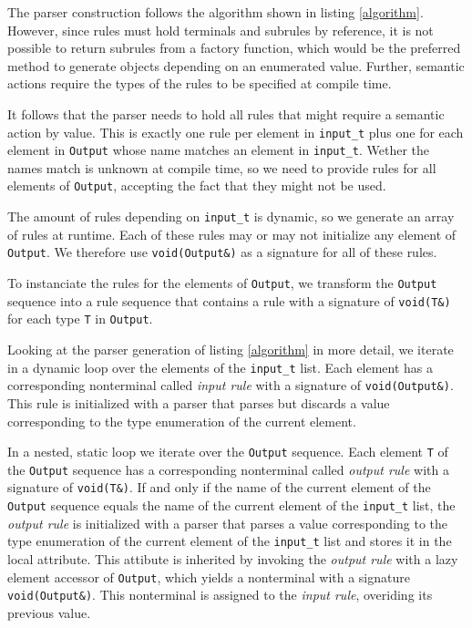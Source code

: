 The parser construction follows the algorithm shown in listing \ref{algorithm}.
However, since rules must hold terminals and subrules by reference, it is not
possible to return subrules from a factory function, which would be the
preferred method to generate objects depending on an enumerated value. Further,
semantic actions require the types of the rules to be specified at compile time.

It follows that the parser needs to hold all rules that might require a semantic
action by value. This is exactly one rule per element in \texttt{input\_t} plus
one for each element in \texttt{Output} whose name matches an element in
\texttt{input\_t}. Wether the names match is unknown at compile time, so we need
to provide rules for all elements of \texttt{Output}, accepting the fact that
they might not be used.

The amount of rules depending on \texttt{input\_t} is dynamic, so we generate an
array of rules at runtime. Each of these rules may or may not initialize any
element of \texttt{Output}. We therefore use \texttt{void(Output\&)} as a
signature for all of these rules.

To instanciate the rules for the elements of \texttt{Output}, we transform
the \texttt{Output} sequence into a rule sequence that contains a rule with a
signature of \texttt{void(T\&)} for each type \texttt{T} in \texttt{Output}.


Looking at the parser generation of listing \ref{algorithm} in more detail, we
iterate in a dynamic loop over the elements of the \texttt{input\_t} list. Each
element has a corresponding nonterminal called \emph{input rule} with a
signature of \texttt{void(Output\&)}. This rule is initialized with a parser
that parses but discards a value corresponding to the type enumeration of the
current element.

In a nested, static loop we iterate over the \texttt{Output} sequence. Each
element \texttt{T} of the \texttt{Output} sequence has a corresponding
nonterminal called \emph{output rule} with a signature of \texttt{void(T\&)}.
If and only if the name of the current element of the \texttt{Output} sequence
equals the name of the current element of the \texttt{input\_t} list, the
\emph{output rule} is initialized with a parser that parses a value
corresponding to the type enumeration of the current element of the
\texttt{input\_t} list and stores it in the local attribute. This attibute is
inherited by invoking the \emph{output rule} with a lazy element accessor of
\texttt{Output}, which yields a nonterminal with a signature
\texttt{void(Output\&)}. This nonterminal is assigned to the \emph{input rule},
overiding its previous value.

